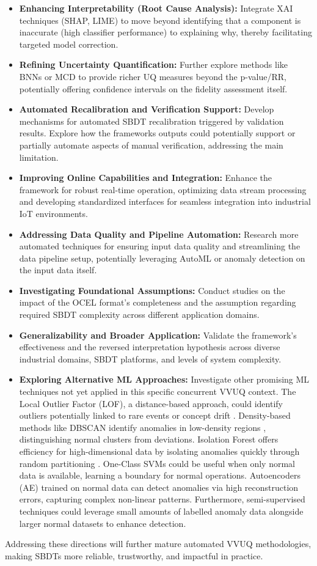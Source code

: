 \begin{itemize}
  \item \textbf{Enhancing Interpretability (Root Cause Analysis):} Integrate XAI techniques (SHAP, LIME) to move beyond identifying that a component is inaccurate (high classifier performance) to explaining why, thereby facilitating targeted model correction.
  \item \textbf{Refining Uncertainty Quantification:} Further explore methods like BNNs or MCD to provide richer UQ measures beyond the p-value/RR, potentially offering confidence intervals on the fidelity assessment itself.
  \item \textbf{Automated Recalibration and Verification Support:} Develop mechanisms for automated SBDT recalibration triggered by validation results. Explore how the frameworks outputs could potentially support or partially automate aspects of manual verification, addressing the main limitation.
  \item \textbf{Improving Online Capabilities and Integration:} Enhance the framework for robust real-time operation, optimizing data stream processing and developing standardized interfaces for seamless integration into industrial IoT environments.
  \item \textbf{Addressing Data Quality and Pipeline Automation:} Research more automated techniques for ensuring input data quality and streamlining the data pipeline setup, potentially leveraging AutoML or anomaly detection on the input data itself.
  \item \textbf{Investigating Foundational Assumptions:} Conduct studies on the impact of the OCEL format's completeness and the assumption regarding required SBDT complexity across different application domains.
  \item \textbf{Generalizability and Broader Application:} Validate the framework's effectiveness and the reversed interpretation hypothesis across diverse industrial domains, SBDT platforms, and levels of system complexity.
  \item \textbf{Exploring Alternative ML Approaches:} Investigate other promising ML techniques not yet applied in this specific concurrent VVUQ context. The Local Outlier Factor (LOF), a distance-based approach, could identify outliers potentially linked to rare events or concept drift \autocite{alghushairy2020review}. Density-based methods like DBSCAN identify anomalies in low-density regions \autocite{ccelik2011anomaly}, distinguishing normal clusters from deviations. Isolation Forest offers efficiency for high-dimensional data by isolating anomalies quickly through random partitioning \autocite{xu2017improved}. One-Class SVMs \autocite{li2003improving} could be useful when only normal data is available, learning a boundary for normal operations. Autoencoders (AE) \autocite{zhou2017anomaly} trained on normal data can detect anomalies via high reconstruction errors, capturing complex non-linear patterns. Furthermore, semi-supervised techniques could leverage small amounts of labelled anomaly data alongside larger normal datasets to enhance detection.
\end{itemize}

Addressing these directions will further mature automated VVUQ methodologies, making SBDTs more reliable, trustworthy, and impactful in practice.